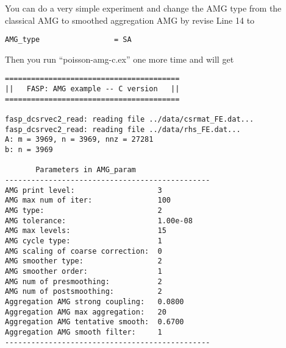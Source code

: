 \documentclass[11pt]{memoir}
\begin{document}
You can do a very simple experiment and change the AMG type from the classical AMG to smoothed aggregation AMG by revise Line 14 to 
%
\begin{lstlisting}[numbers=none]
AMG_type                 = SA
\end{lstlisting}
%
Then you run ``poisson-amg-c.ex'' one more time and will get 
%
\begin{lstlisting}[numbers=none]
========================================
||   FASP: AMG example -- C version   ||
========================================

fasp_dcsrvec2_read: reading file ../data/csrmat_FE.dat...
fasp_dcsrvec2_read: reading file ../data/rhs_FE.dat...
A: m = 3969, n = 3969, nnz = 27281
b: n = 3969

       Parameters in AMG_param
-----------------------------------------------
AMG print level:                   3
AMG max num of iter:               100
AMG type:                          2
AMG tolerance:                     1.00e-08
AMG max levels:                    15
AMG cycle type:                    1
AMG scaling of coarse correction:  0
AMG smoother type:                 2
AMG smoother order:                1
AMG num of presmoothing:           2
AMG num of postsmoothing:          2
Aggregation AMG strong coupling:   0.0800
Aggregation AMG max aggregation:   20
Aggregation AMG tentative smooth:  0.6700
Aggregation AMG smooth filter:     1
-----------------------------------------------


\end{lstlisting}
\end{document}
